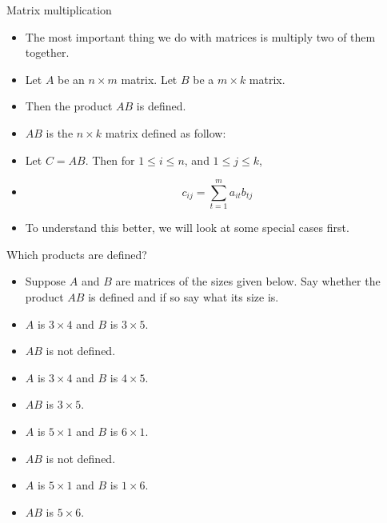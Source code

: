 \documentclass{beamer}
\begin{document}


\begin{frame}{Matrix multiplication}

\begin{itemize}
\item The most important thing we do with matrices is multiply two of
them together.
\item Let $A$ be an $n\times m$ matrix. Let $B$ be a $m\times k$ matrix.
\item Then the product $A B$ is defined.
\item $A B$ is the $n\times k$ matrix defined as follow:
\item Let $C=A B$. Then for $1\leq i \leq n$, and $1\leq j \leq k$,
\item $$c_{ij} = \sum_{t=1}^m a_{it} b_{tj}$$
\item To understand this better, we will look at some special cases first.
\end{itemize}

\end{frame}



\begin{frame}{Which products are defined?}

\begin{itemize}
\item Suppose $A$ and $B$ are matrices of the sizes given below. Say
whether the product $A B$ is defined and if so say what its size is.
\item $A$ is $3\times 4$ and $B$ is $3\times 5$.
\item  $A B$ is not defined.
\item $A$ is $3 \times 4$ and $B$ is $4 \times 5$.
\item $A B$ is $3 \times 5$.
\item $A$ is $5\times 1$ and $B$ is $6\times 1$.
\item $A B$ is not defined.
\item $A$ is $5\times 1$ and $B$ is $1\times 6$.
\item $A B$ is $5\times 6$.
\end{itemize}

\end{frame}

\end{document}
